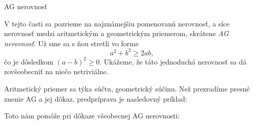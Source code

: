 \secc AG nerovnosť

V tejto časti sa pozrieme na najznámejšiu pomenovanú nerovnosť, a síce nerovnosť medzi aritmetickým a geometrickým priemerom, skrátene \textit{AG nerovnosť}. Už sme sa s ňou stretli vo forme
$$
a^2+b^2 \ge 2ab,
$$
čo je dôsledkom $(a-b)^2 \ge 0$. Ukážeme, že táto jednoduchá nerovnosť sa dá zovšeobecniť na niečo netriviálne.

Aritmetický priemer sa týka súčtu, geometrický súčinu. Než prezradíme presné znenie AG a jej dôkaz, predpríprava je nasledovný príklad:


Toto nám pomôže pri dôkaze všeobecnej AG nerovnosti:

